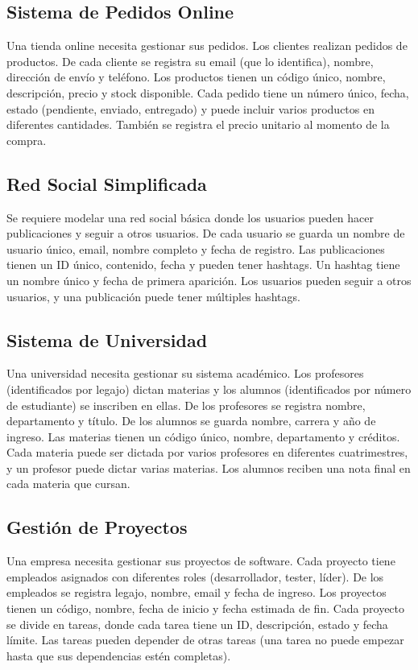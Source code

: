 \documentclass[12pt]{article}
\begin{document}
\subsection{Sistema de Pedidos Online}
Una tienda online necesita gestionar sus pedidos. Los clientes realizan pedidos de productos. De cada cliente se registra su email (que lo identifica), nombre, dirección de envío y teléfono. Los productos tienen un código único, nombre, descripción, precio y stock disponible. Cada pedido tiene un número único, fecha, estado (pendiente, enviado, entregado) y puede incluir varios productos en diferentes cantidades. También se registra el precio unitario al momento de la compra.

\subsection{Red Social Simplificada}
Se requiere modelar una red social básica donde los usuarios pueden hacer publicaciones y seguir a otros usuarios. De cada usuario se guarda un nombre de usuario único, email, nombre completo y fecha de registro. Las publicaciones tienen un ID único, contenido, fecha y pueden tener hashtags. Un hashtag tiene un nombre único y fecha de primera aparición. Los usuarios pueden seguir a otros usuarios, y una publicación puede tener múltiples hashtags.

\subsection{Sistema de Universidad}
Una universidad necesita gestionar su sistema académico. Los profesores (identificados por legajo) dictan materias y los alumnos (identificados por número de estudiante) se inscriben en ellas. De los profesores se registra nombre, departamento y título. De los alumnos se guarda nombre, carrera y año de ingreso. Las materias tienen un código único, nombre, departamento y créditos. Cada materia puede ser dictada por varios profesores en diferentes cuatrimestres, y un profesor puede dictar varias materias. Los alumnos reciben una nota final en cada materia que cursan.

\subsection{Gestión de Proyectos}
Una empresa necesita gestionar sus proyectos de software. Cada proyecto tiene empleados asignados con diferentes roles (desarrollador, tester, líder). De los empleados se registra legajo, nombre, email y fecha de ingreso. Los proyectos tienen un código, nombre, fecha de inicio y fecha estimada de fin. Cada proyecto se divide en tareas, donde cada tarea tiene un ID, descripción, estado y fecha límite. Las tareas pueden depender de otras tareas (una tarea no puede empezar hasta que sus dependencias estén completas).
\end{document}
